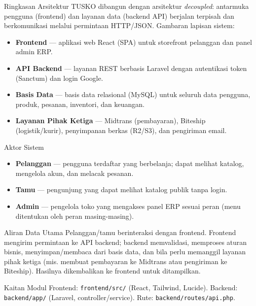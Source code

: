 
\begin{flowsection}{Ringkasan Arsitektur}
TUSKO dibangun dengan arsitektur \emph{decoupled}: antarmuka pengguna (frontend)
dan layanan data (backend API) berjalan terpisah dan berkomunikasi melalui
permintaan HTTP/JSON. Gambaran lapisan sistem:
\begin{itemize}
  \item \textbf{Frontend} --- aplikasi web React (SPA) untuk storefront pelanggan
        dan panel admin ERP.
  \item \textbf{API Backend} --- layanan REST berbasis Laravel dengan autentikasi
        token (Sanctum) dan login Google.
  \item \textbf{Basis Data} --- basis data relasional (MySQL) untuk seluruh data
        pengguna, produk, pesanan, inventori, dan keuangan.
  \item \textbf{Layanan Pihak Ketiga} --- Midtrans (pembayaran), Biteship
        (logistik/kurir), penyimpanan berkas (R2/S3), dan pengiriman email.
\end{itemize}
\end{flowsection}


\begin{flowsection}{Aktor Sistem}
\begin{itemize}
  \item \textbf{Pelanggan} --- pengguna terdaftar yang berbelanja; dapat melihat
        katalog, mengelola akun, dan melacak pesanan.
  \item \textbf{Tamu} --- pengunjung yang dapat melihat katalog publik tanpa login.
  \item \textbf{Admin} --- pengelola toko yang mengakses panel ERP sesuai peran
        (menu ditentukan oleh peran masing-masing).
\end{itemize}
\end{flowsection}

\begin{flowsection}{Aliran Data Utama}
Pelanggan/tamu berinteraksi dengan frontend. Frontend mengirim permintaan ke API
backend; backend memvalidasi, memproses aturan bisnis, menyimpan/membaca dari
basis data, dan bila perlu memanggil layanan pihak ketiga (mis. membuat
pembayaran ke Midtrans atau pengiriman ke Biteship). Hasilnya dikembalikan ke
frontend untuk ditampilkan.
\end{flowsection}

\begin{flowsection}{Kaitan Modul}
Frontend: \texttt{frontend/src/} (React, Tailwind, Lucide). Backend:
\texttt{backend/app/} (Laravel, controller/service). Rute: \texttt{backend/routes/api.php}.
\end{flowsection}

